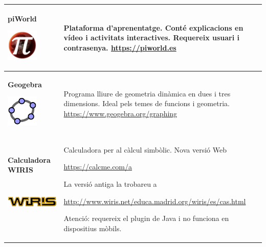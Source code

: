 \begin{center}
	\renewcommand{\arraystretch}{1.5}
	\begin{longtable}[h]{>{\raggedleft\arraybackslash}p{}|p{}}
		\hline
		\textbf{piWorld}
		
		\includegraphics[height=1.5cm]{img-00/piworld}
		& Plataforma d'aprenentatge. Conté explicacions en vídeo i activitats interactives. Requereix usuari i contrasenya. \newline
		\quad \href{https://piworld.es}{\href{https://piworld.es}{https://piworld.es}}
		\\ \hline
		\textbf{Geogebra} 
		
		\includegraphics[height=1.5cm]{img-00/geogebra}
		& Programa lliure de geometria dinàmica en dues i tres dimensions.
		Ideal pels temes de funcions i geometria.\newline
		\quad  \href{https://www.geogebra.org/download}{\href{https://www.geogebra.org/graphing}{https://www.geogebra.org/graphing}}
		\\ \hline
		\textbf{Calculadora WIRIS}
		
		
		\includegraphics[height=2cm]{img-00/wiris}
		& Calculadora per al càlcul simbòlic. Nova versió Web \par \quad  \href{https://calcme.com/a}{https://calcme.com/a}
		
		La versió antiga la trobareu a \par \quad  \href{http://www.wiris.net/educa.madrid.org/wiris/es/cas.html}{http://www.wiris.net/educa.madrid.org/wiris/es/cas.html}
		
		Atenció: requereix el plugin de Java i no funciona en dispositius mòbils.
		\\ \hline
		
	\end{longtable}
\end{center}
